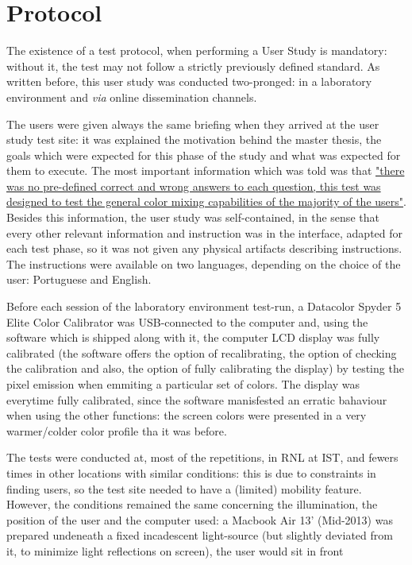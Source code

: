 \section{Protocol}
\label{sec:results_protocol}
%
The existence of a test protocol, when performing a User Study is mandatory: without it, the test may not follow a strictly previously defined
standard. As written before, this user study was conducted two-pronged: in a laboratory environment and \emph{via} online dissemination channels. \par
%
The users were given always the same briefing when they arrived at the user study test site: it was explained the motivation behind the master
thesis, the goals which were expected for this phase of the study and what was expected for them to execute. The most important information which
was told was that \ul{"there was no pre-defined correct and wrong answers to each question, this test was designed to test the general
color mixing capabilities of the majority of the users"}. Besides this information, the user study was self-contained, in the sense that
every other relevant information and instruction was in the interface, adapted for each test phase, so it was not given any physical artifacts
describing instructions. The instructions were available on two languages, depending on the choice of the user: Portuguese and English. \par
%
Before each session of the laboratory environment test-run, a Datacolor Spyder 5 Elite Color Calibrator was USB-connected to the computer and, using
the software which is shipped along with it, the computer LCD display was fully calibrated (the software offers the option of recalibrating,
the option of checking the calibration and also, the option of fully calibrating the display) by testing the pixel emission when emmiting a particular
set of colors. The display was everytime fully calibrated, since the software manisfested an erratic bahaviour when using the other functions:
the screen colors were presented in a very warmer/colder color profile tha it was before. \par
%
The tests were conducted at, most of the repetitions, in \gls{RNL} at \gls{IST}, and fewers times in other locations with similar conditions:
this is due to constraints in finding users, so the test site needed to have a (limited) mobility feature. However, the conditions remained
the same concerning the illumination, the position of the user and the computer used: a Macbook Air 13' (Mid-2013) was prepared undeneath
a fixed incadescent light-source (but slightly deviated from it, to minimize light reflections on screen), the user would sit in front
